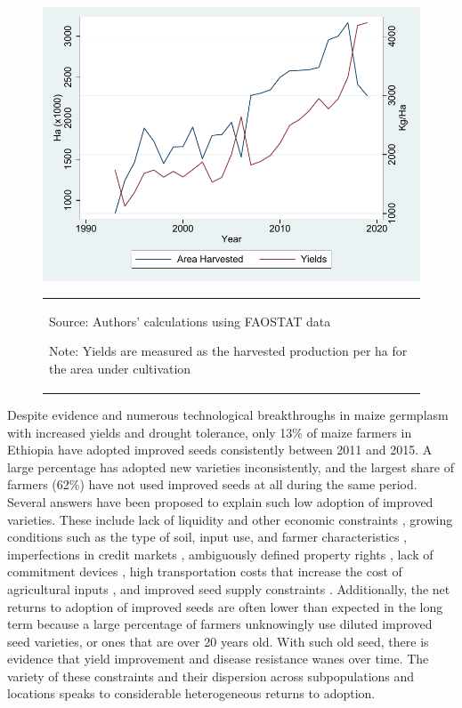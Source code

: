 \documentclass[11pt]{article}
\begin{document}
\begin{figure}[htp]
    \centering
    \caption{Maize: Total area harvested and average yields} \label{fig:maize_yields}
    \includegraphics[width=.6\textwidth]{results/figures/Maize_yields.pdf}
    \vspace*{-1em}
    \begin{table}[H]
        \centering
        \begin{tabular}{p{}} 
            \begin{tablenotes}[flushleft]
                  \small
                  \item Source: Authors' calculations using FAOSTAT data 
                  \item Note: Yields are measured as the harvested production per ha for the area under cultivation
            \end{tablenotes}
        \end{tabular}
    \end{table}       
\end{figure}



Despite evidence and numerous technological breakthroughs in maize germplasm with increased yields and drought tolerance, only 13\% of maize farmers in Ethiopia have adopted improved seeds consistently between 2011 and 2015. A large percentage has adopted new varieties inconsistently, and the largest share of farmers (62\%) have not used improved seeds at all during the same period. Several answers have been proposed to explain such low adoption of improved varieties. These include lack of liquidity and other economic constraints \citep{Carter2014-fm}, growing conditions such as the type of soil, input use, and farmer characteristics \citep{Munshi2004-og}, imperfections in credit markets \citep{Croppenstedt2003-pq}, ambiguously defined property rights \citep{Place2000-el}, lack of commitment devices \cite{Duflo2009-iv}, high transportation costs that increase the cost of agricultural inputs \citep{Byerlee2013-qk}, and improved seed supply constraints \citep{Bird2020-nt}. Additionally, the net returns to adoption of improved seeds are often lower than expected in the long term because a large percentage of farmers unknowingly use diluted improved seed varieties, or ones that are over 20 years old. With such old seed, there is evidence that yield improvement and disease resistance wanes over time\citep{Abate2015-rj}. The variety of these constraints and their dispersion across subpopulations and locations speaks to considerable heterogeneous returns to adoption.      
\end{document}
